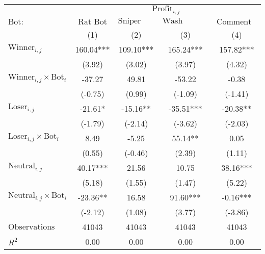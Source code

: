 \begin{tabular}{lcccc}
\toprule
 & \multicolumn{4}{c}{$\text{Profit}_{i,j}$} \\
\cline{2-5}
 $\text{Bot}:$ & $\text{Rat Bot}$ & $\text{Sniper Bot}$ & $\text{Wash Trading Bot}$ & $\text{Comment Bot}$ \\
 & (1) & (2) & (3) & (4)\\
\midrule
$\text{Winner}_{i,j}$ & 160.04*** & 109.10*** & 165.24*** & 157.82*** \\
 & (3.92) & (3.02) & (3.97) & (4.32) \\
$\text{Winner}_{i,j} \times \text{Bot}_i$ & -37.27 & 49.81 & -53.22 & -0.38 \\
 & (-0.75) & (0.99) & (-1.09) & (-1.41) \\
$\text{Loser}_{i,j}$ & -21.61* & -15.16** & -35.51*** & -20.38** \\
 & (-1.79) & (-2.14) & (-3.62) & (-2.03) \\
$\text{Loser}_{i,j} \times \text{Bot}_i$ & 8.49 & -5.25 & 55.14** & 0.05 \\
 & (0.55) & (-0.46) & (2.39) & (1.11) \\
$\text{Neutral}_{i,j}$ & 40.17*** & 21.56 & 10.75 & 38.16*** \\
 & (5.18) & (1.55) & (1.47) & (5.22) \\
$\text{Neutral}_{i,j} \times \text{Bot}_i$ & -23.36** & 16.58 & 91.60*** & -0.16*** \\
 & (-2.12) & (1.08) & (3.77) & (-3.86) \\
\midrule
$\text{Observations}$ & 41043 & 41043 & 41043 & 41043 \\
$R^2$ & 0.00 & 0.00 & 0.00 & 0.00 \\
\bottomrule
\end{tabular}